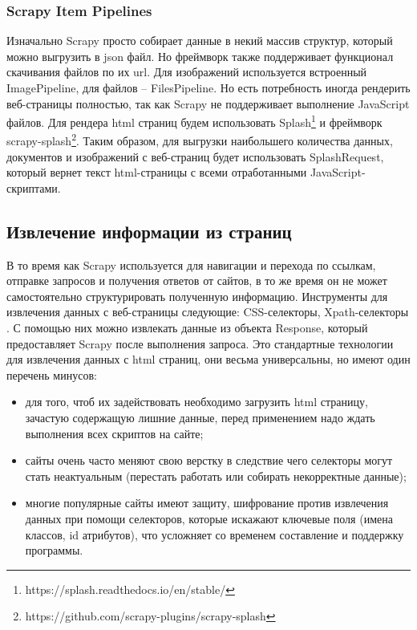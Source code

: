 \subsubsection{Scrapy Item Pipelines}  
Изначально Scrapy просто собирает данные в некий массив структур, который можно выгрузить в json файл. Но фреймворк также 
поддерживает функционал скачивания файлов по их url. Для изображений используется встроенный ImagePipeline, для файлов --
FilesPipeline. Но есть потребность иногда рендерить веб-страницы полностью, так как Scrapy не поддерживает выполнение JavaScript
файлов. Для рендера html страниц будем использовать Splash\footnote{https://splash.readthedocs.io/en/stable/} и фреймворк 
scrapy-splash\footnote{https://github.com/scrapy-plugins/scrapy-splash}. Таким образом, для выгрузки наибольшего количества
данных, документов и изображений с веб-страниц будет использовать SplashRequest, который вернет текст html-страницы с всеми
отработанными JavaScript-скриптами.

\subsection{Извлечение информации из страниц}
В то время как Scrapy используется для навигации и перехода по ссылкам, отправке запросов и получения ответов от сайтов, в то же
время он не может самостоятельно структурировать полученную информацию. Инструменты для извлечения данных с веб-страницы следующие:
CSS-селекторы, Xpath-селекторы \cite{cssXpathSelectors}. С помощью них можно извлекать данные из объекта Response, который 
предоставляет Scrapy после выполнения запроса. Это стандартные технологии для извлечения данных с html страниц, они весьма
универсальны, но имеют один перечень минусов:
\begin{itemize}
    \item для того, чтоб их задействовать необходимо загрузить html страницу, зачастую
    содержащую лишние данные, перед применением надо ждать выполнения всех скриптов на сайте;
    \item сайты очень часто меняют свою верстку в следствие чего селекторы могут стать неактуальным (перестать работать 
    или собирать некорректные данные);
    \item многие популярные сайты имеют защиту, шифрование против извлечения данных при помощи селекторов, которые искажают
    ключевые поля (имена классов, id атрибутов), что усложняет со временем составление и поддержку программы.
\end{itemize} 

